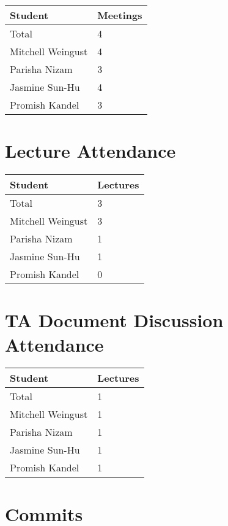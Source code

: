 \documentclass{article}
\begin{document}
\begin{table}[H]
\centering
\begin{tabular}{ll}
\toprule
\textbf{Student} & \textbf{Meetings}\\
\midrule
Total & 4\\
Mitchell Weingust & 4\\
Parisha Nizam & 3\\
Jasmine Sun-Hu & 4\\
Promish Kandel & 3\\
\bottomrule
\end{tabular}
\end{table}

\section{Lecture Attendance}

\begin{table}[H]
\centering
\begin{tabular}{ll}
\toprule
\textbf{Student} & \textbf{Lectures}\\
\midrule
Total & 3\\
Mitchell Weingust & 3\\
Parisha Nizam & 1\\
Jasmine Sun-Hu & 1\\
Promish Kandel & 0\\
\bottomrule
\end{tabular}
\end{table}

\section{TA Document Discussion Attendance}

\begin{table}[H]
\centering
\begin{tabular}{ll}
\toprule
\textbf{Student} & \textbf{Lectures}\\
\midrule
Total & 1\\
Mitchell Weingust & 1\\
Parisha Nizam & 1\\
Jasmine Sun-Hu & 1\\
Promish Kandel & 1\\
\bottomrule
\end{tabular}
\end{table}

\section{Commits}
\end{document}
